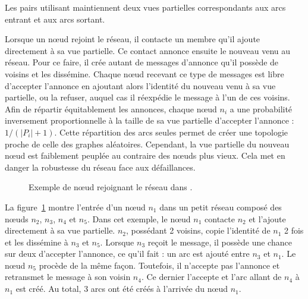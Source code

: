 \noindent Les pairs utilisant \SCAMP maintiennent deux vues partielles
correspondants aux arcs entrant et aux arcs sortant.

\noindent Lorsque un nœud rejoint le réseau, il contacte un membre qu'il ajoute
directement à sa vue partielle. Ce contact annonce ensuite le nouveau venu au
réseau. Pour ce faire, il crée autant de messages d'annonce qu'il possède de
voisins et les dissémine. Chaque nœud recevant ce type de messages est libre
d'accepter l'annonce en ajoutant alors l'identité du nouveau venu à sa vue
partielle, ou la refuser, auquel cas il réexpédie le message à l'un de ces
voisins. Afin de répartir équitablement les annonces, chaque nœud $n_i$ a une
probabilité inversement proportionnelle à la taille de sa vue partielle
d'accepter l'annonce : $1/(|P_i|+1)$. Cette répartition des arcs seules permet
de créer une topologie proche de celle des graphes aléatoires. Cependant, la vue
partielle du nouveau nœud est faiblement peuplée au contraire des nœuds plus
vieux. Cela met en danger la robustesse du réseau face aux défaillances.

\begin{figure}
  \centering
  
  \caption[Entrée dans un réseau dans \SCAMP]
  {\label{net:fig:scampexample} Exemple de nœud rejoignant le réseau dans
    \SCAMP.}
\end{figure}

\noindent La figure~\ref{net:fig:scampexample} montre l'entrée d'un nœud $n_1$
dans un petit réseau \SCAMP composé des nœuds $n_2$, $n_3$, $n_4$ et $n_5$. Dans
cet exemple, le nœud $n_1$ contacte $n_2$ et l'ajoute directement à sa vue
partielle. $n_2$, possédant 2 voisins, copie l'identité de $n_1$ 2 fois et les
dissémine à $n_3$ et $n_5$. Lorsque $n_3$ reçoit le message, il possède une
chance sur deux d'accepter l'annonce, ce qu'il fait : un arc est ajouté entre
$n_3$ et $n_1$. Le nœud $n_5$ procède de la même façon. Toutefois, il n'accepte
pas l'annonce et retransmet le message à son voisin $n_4$. Ce dernier l'accepte
et l'arc allant de $n_4$ à $n_1$ est créé. Au total, 3 arcs ont été créés à
l'arrivée du nœud $n_1$.


